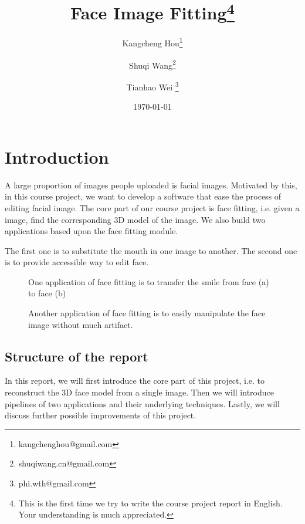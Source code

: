 \documentclass{article}
\title{Face Image Fitting\footnote{This is the first time we try to write the course project report in English. Your understanding is much appreciated.}}
\author{Kangcheng Hou\footnote{kangchenghou@gmail.com} \and Shuqi Wang\footnote{shuqiwang.cn@gmail.com} \and Tianhao Wei \footnote{phi.wth@gmail.com}}
\date{\today}
\begin{document}
\maketitle
\tableofcontents

\section{Introduction}
A large proportion of images people uploaded is facial images. Motivated by this, in this course project, we want to develop a software that ease the process of editing facial image. The core part of our course project is face fitting, i.e. given a image, find the corresponding 3D model of the image. We also build two applications based upon the face fitting module.

The first one is to substitute the mouth in one image to another. The second one is to provide accessible way to edit face.
\begin{figure}
    \centering
    \hfill
    \caption{One application of face fitting is to transfer the smile from face (a) to face (b)}
\end{figure}
\begin{figure}
    \centering
    \hfill
    \caption{Another application of face fitting is to easily manipulate the face image without much artifact.}
\end{figure}

\subsection{Structure of the report}
In this report, we will first introduce the core part of this project, i.e. to reconstruct the 3D face model from a single image. Then we will introduce pipelines of two applications and their underlying techniques. Lastly, we will discuss further possible improvements of this project.
     


 



 
\end{document}
